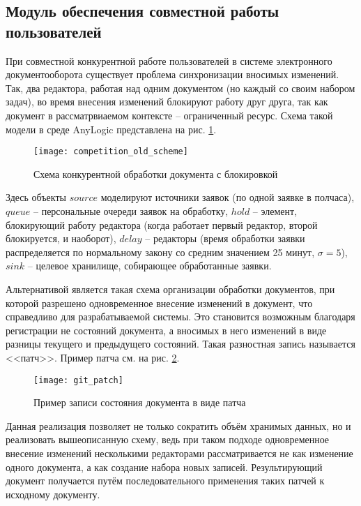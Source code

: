 \subsection{Модуль обеспечения совместной работы пользователей} \label{research_competition}

При совместной конкурентной работе пользователей в системе электронного документооборота существует проблема синхронизации вносимых изменений. Так, два редактора, работая над одним документом (но каждый со своим набором задач), во время внесения изменений блокируют работу друг друга, так как документ в рассматрвиаемом контексте -- ограниченный ресурс. Схема такой модели в среде AnyLogic представлена на рис. \ref{img:competition_old_scheme}.

\begin{figure}[h!]
  \centering
  \texttt{[image: competition\_old\_scheme]}
  \caption{Схема конкурентной обработки документа с блокировкой}
  \label{img:competition_old_scheme}
\end{figure}

Здесь объекты $source$ моделируют источники заявок (по одной заявке в полчаса), $queue$ -- персональные очереди заявок на обработку, $hold$ -- элемент, блокирующий работу редактора (когда работает первый редактор, второй блокируется, и наоборот), $delay$ -- редакторы (время обработки заявки распределяется по нормальному закону со средним значением 25 минут, $\sigma=5$), $sink$ -- целевое хранилище, собирающее обработанные заявки.

\vspace{\baselineskip}
Альтернативой является такая схема организации обработки документов, при которой разрешено одновременное внесение изменений в документ, что справедливо для разрабатываемой системы. Это становится возможным благодаря регистрации не состояний документа, а вносимых в него изменений в виде разницы текущего и предыдущего состояний. Такая разностная запись называется <<патч>>. Пример патча см. на рис. \ref{img:git_patch}.

\begin{figure}[h!]
  \centering
  \texttt{[image: git\_patch]}
  \caption{Пример записи состояния документа в виде патча}
  \label{img:git_patch}
\end{figure}

Данная реализация позволяет не только сократить объём хранимых данных, но и реализовать вышеописанную схему, ведь при таком подходе одновременное внесение изменений несколькими редакторами рассматривается не как изменение одного документа, а как создание набора новых записей. Результирующий документ получается путём последовательного применения таких патчей к исходному документу.

